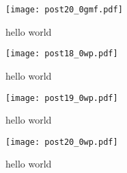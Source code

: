 \documentclass[12pt, preprint]{emulateapj}
\begin{document}
\begin{figure*}
\begin{center}
\texttt{[image: post20\_0gmf.pdf]}
\caption{hello world}
\label{fig:abc_converge}
\end{center}
\end{figure*}

\begin{figure*}
\begin{center}
\texttt{[image: post18\_0wp.pdf]}
\caption{hello world}
\label{fig:abc_converge}
\end{center}
\end{figure*}

\begin{figure*}
\begin{center}
\texttt{[image: post19\_0wp.pdf]}
\caption{hello world}
\label{fig:abc_converge}
\end{center}
\end{figure*}

\begin{figure*}
\begin{center}
\texttt{[image: post20\_0wp.pdf]}
\caption{hello world}
\label{fig:abc_converge}
\end{center}
\end{figure*}
\end{document}
